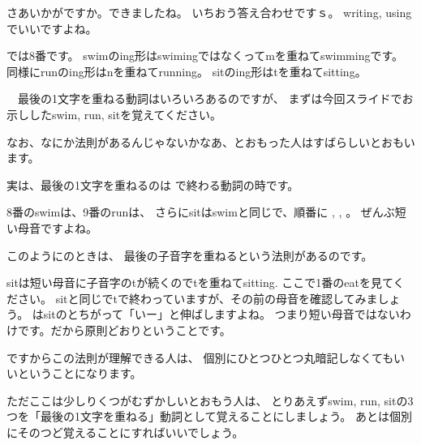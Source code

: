 \documentclass[book,jafontscale=0.9247]{jlreq}
\let\textipa\relax
\begin{document}
さあいかがですか。できましたね。
いちおう答え合わせですｓ。
writing, usingでいいですよね。

では8番です。
swimのing形はswimingではなくってmを重ねてswimmingです。
同様にrunのing形はnを重ねてrunning。
sitのing形はtを重ねてsitting。


\dbend\,\,\,\,%
最後の1文字を重ねる動詞はいろいろあるのですが、
まずは今回スライドでお示ししたswim, run, sitを覚えてください。

なお、なにか法則があるんじゃないかなあ、とおもった人はすばらしいとおもいます。

実は、最後の1文字を重ねるのは
で終わる動詞の時です。

8番のswimは\textipa{/I/}、9番のrunは\textipa{/\textturnv /}、
さらにsitはswimと同じで\textipa{/I/}、順番に
\textipa{/I/}, \textipa{/\textturnv /}, \textipa{/I/}。
ぜんぶ短い母音ですよね。

このようにのときは、
最後の子音字を重ねるという法則があるのです。

sitは短い母音\textipa{/I/}に子音字のtが続くのでtを重ねてsitting.
ここで1番のeatを見てください。
sitと同じでtで終わっていますが、その前の母音を確認してみましょう。
\textipa{/i:/}はsitの\textipa{/I/}とちがって「いー」と伸ばしますよね。
つまり短い母音ではないわけです。だから原則どおりということです。


ですからこの法則が理解できる人は、
個別にひとつひとつ丸暗記しなくてもいいということになります。

ただここは少しりくつがむずかしいとおもう人は、
とりあえずswim, run, sitの3つを「最後の1文字を重ねる」動詞として覚えることにしましょう。
あとは個別にそのつど覚えることにすればいいでしょう。
\end{document}
